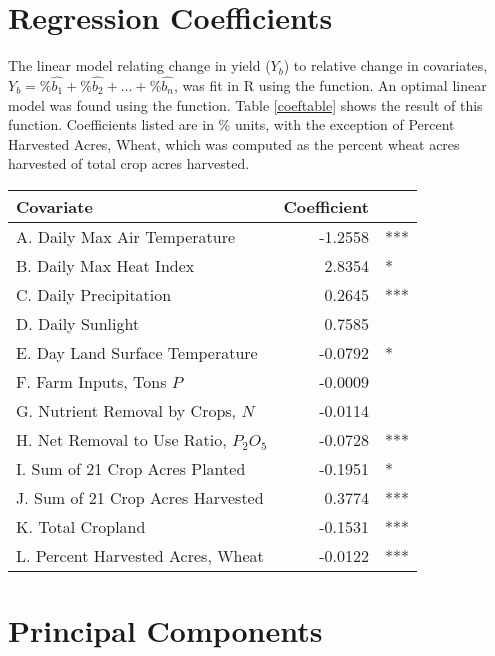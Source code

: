 \documentclass{article}
\newcommand{\tmtextbf}[1]{{\bfseries{#1}}}
\newcommand{\tmtexttt}[1]{{\ttfamily{#1}}}
\begin{document}
\section{Regression Coefficients}

The linear model relating change in yield ($Y_b$) to relative change in
covariates, $Y_b =\% \widehat{b_1} +\% \widehat{b_2} + \ldots +\%
\widehat{b_n}$, was fit in R using the \tmtexttt{lm} function. An optimal
linear model was found using the \tmtexttt{step} function. Table
\ref{coeftable} shows the result of this function. Coefficients listed are in
\% units, with the exception of Percent Harvested Acres, Wheat, which was
computed as the percent wheat acres harvested of total crop acres harvested.
\begin{center}
  \begin{tabular}{lrl}
    \hline
    \tmtextbf{Covariate} & \tmtextbf{Coefficient} & \\
    \hline
    A. Daily Max Air Temperature {\cite{nldas}} & -1.2558 & ***\\
    B. Daily Max Heat Index {\cite{nldas}} & 2.8354 & *\\
    C. Daily Precipitation {\cite{nldas}} & 0.2645 & ***\\
    D. Daily Sunlight {\cite{nldas}} & 0.7585 & \\
    E. Day Land Surface Temperature {\cite{modis}} & -0.0792 & *\\
    F. Farm Inputs, Tons $P$ {\cite{nuGIS}} & -0.0009 & \\
    G. Nutrient Removal by Crops, $N$ {\cite{nuGIS}} & -0.0114 & \\
    H. Net Removal to Use Ratio, $P_2 O_5$ {\cite{nuGIS}} & -0.0728 & ***\\
    I. Sum of 21 Crop Acres Planted {\cite{nuGIS}} & -0.1951 & *\\
    J. Sum of 21 Crop Acres Harvested {\cite{nuGIS}} & 0.3774 & ***\\
    K. Total Cropland {\cite{nuGIS}} & -0.1531 & ***\\
    L. Percent Harvested Acres, Wheat & -0.0122 & ***\\
    \hline
  \end{tabular} {}\label{coeftable}
\end{center}

\section{Principal Components}
\end{document}
